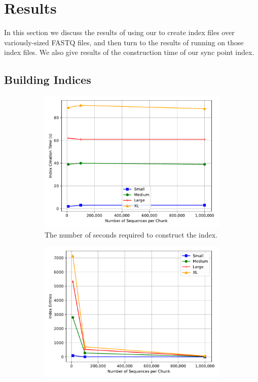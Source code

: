 \section{Results}
\label{sec:results}


In this section we discuss the results of using our \ibuilder to create index
files over variously-sized \gzip FASTQ files, and then turn to the results of
running \ireader on those index files. We also give results of the construction
time of our sync point index.

\subsection{Building Indices}
\label{sec:buildresults}

\begin{figure}%
\centering
    \begin{subfigure}[c]{.48\textwidth}
        \includegraphics[width=\linewidth]{figs/creation-time.pdf}
        \caption{The number of seconds required to construct the index.}
        \label{fig:creation}
    \end{subfigure}%
    \begin{subfigure}[c]{.48\textwidth}
        \includegraphics[width=\linewidth]{figs/index-entries.pdf}

\end{subfigure}
\end{figure}
